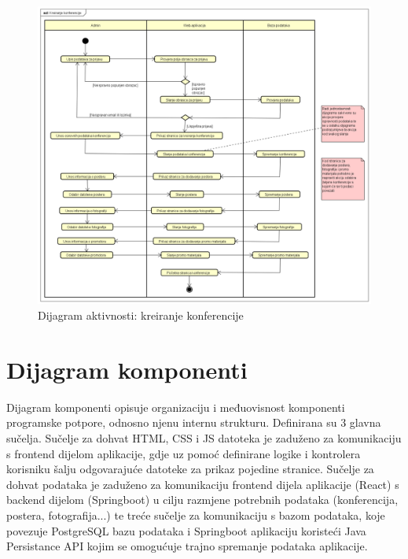 			\begin{figure}[H]
				\includegraphics[width=\textwidth]{slike/dijagramAktivnosti.PNG} %
				\caption{Dijagram aktivnosti: kreiranje konferencije}
				\label{fig:dijagramAktivnosti} %
			\end{figure}
			
			\eject
		\section{Dijagram komponenti}

			 Dijagram komponenti opisuje organizaciju i međuovisnost komponenti programske potpore, odnosno njenu internu strukturu. Definirana su 3 glavna sučelja. Sučelje za dohvat HTML, CSS i JS datoteka je zaduženo za komunikaciju s frontend dijelom aplikacije, gdje uz pomoć definirane logike i kontrolera korisniku šalju odgovarajuće datoteke za prikaz pojedine stranice. Sučelje za dohvat podataka je zaduženo za komunikaciju frontend dijela aplikacije (React) s backend dijelom (Springboot) u cilju razmjene potrebnih podataka (konferencija, postera, fotografija...) te treće sučelje za komunikaciju s bazom podataka, koje povezuje PostgreSQL bazu podataka i Springboot aplikaciju koristeći Java Persistance API kojim se omogućuje trajno spremanje podataka aplikacije.
			 

